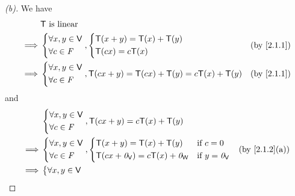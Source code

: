 \begin{proof}[(b)]
  We have
  \begin{align*}
             & \T \text{ is linear}                                                                     \\
    \implies & \begin{dcases}
                 \forall x, y \in \V \\
                 \forall c \in \F
               \end{dcases}, \begin{dcases}
                               \T(x + y) = \T(x) + \T(y) \\
                               \T(cx) = c\T(x)
                             \end{dcases}                               &  & \text{(by \cref{2.1.1})}   \\
    \implies & \begin{dcases}
                 \forall x, y \in \V \\
                 \forall c \in \F
               \end{dcases}, \T(cx + y) = \T(cx) + \T(y) = c\T(x) + \T(y) &  & \text{(by \cref{2.1.1})}
  \end{align*}
  and
  \begin{align*}
             & \begin{dcases}
                 \forall x, y \in \V \\
                 \forall c \in \F
               \end{dcases}, \T(cx + y) = c\T(x) + \T(y)                                                        \\
    \implies & \begin{dcases}
                 \forall x, y \in \V \\
                 \forall c \in \F
               \end{dcases}, \begin{dcases}
                               \T(x + y) = \T(x) + \T(y)             & \text{if } c = 0        \\
                               \T(cx + \zv_{\V}) = c\T(x) + \zv_{\W} & \text{if } y = \zv_{\V}
                             \end{dcases} &  & \text{(by \cref{2.1.2}(a))}                    \\
    \implies & \begin{dcases}
                 \forall x, y \in \V \\

\end{dcases}
\end{align*}
\end{proof}
